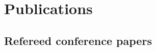 
\section{Publications}

\subsection{Refereed conference papers}


\cite{Rivera2009}
\cite{Rivera2010}
\cite{Madera2009}


  








%
%
%


